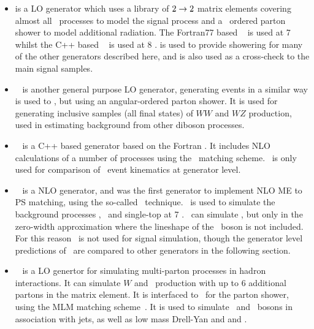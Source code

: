 \begin{itemize}
    \item \pythia is a LO generator which uses a library of $2\rightarrow2$
    matrix elements covering almost all \sm\ processes to model the signal
    process and a \pt\ ordered parton shower to model additional radiation.
    The Fortran77 based
    ~\cite{pythia} is used at 7 \tev\, whilst the C++ based
    ~\cite{Sjostrand:2007gs} is used at 8 \tev. \pythia is used to
    provide showering for many of the other generators described here, and is
    also used as a cross-check to the main signal samples.

    \item \herwig~\cite{Herwig} is another general purpose LO generator, generating events in a
    similar way is used to \pythia, but using an angular-ordered parton shower.
    It is used for generating inclusive samples (all final
    states) of $WW$ and $WZ$ production, used in estimating background from
    other diboson processes.

    \item \herwigPP~\cite{Bahr:2008pv} is a C++ based generator based on the
    Fortran \herwig. It includes NLO calculations of a number of processes
    using the \powheg\ matching scheme. \herwigPP\ is only used for comparison
    of \ZZ\ event kinematics at generator level.

    \item \mcatnlo~\cite{bib:mcatnlo} is a NLO generator, and was the first
    generator to implement NLO ME to PS matching, using the so-called \mcatnlo\
    technique. \mcatnlo\ is used to simulate the background processes \ttbar,
    \Wt\ and single-top at 7 \tev. \mcatnlo\ can simulate \qqZZ, but only in the
    zero-width approximation where the lineshape of the \Z\ boson is not
    included. For this reason \mcatnlo\ is not used for signal simulation,
    though the generator level predictions of \mcatnlo\ are compared to other
    generators in the following section.

    \item \alpgen~\cite{alpgen} is a LO genertor for simulating multi-parton
    processes in hadron interactions. It can simulate $W$ and \Z\ production
    with up to 6 additional partons in the matrix element. It is interfaced to
    \herwig\ for the parton shower, using the MLM matching
    scheme~\cite{Mangano2002343}. It is used to simulate \W\ and \Z\ bosons in
    association with jets, as well as low mass Drell-Yan and \Wg and \Zg.



\end{itemize}

